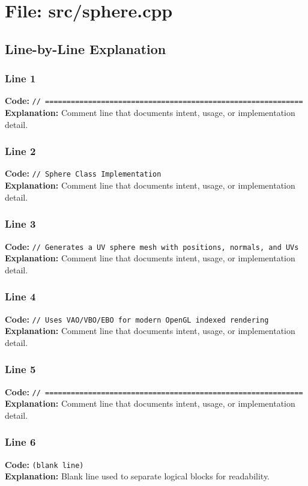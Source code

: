 \documentclass[11pt,a4paper]{article}
\begin{document}
\newpage
\section{File: src/sphere.cpp}
\subsection{Line-by-Line Explanation}
\subsubsection*{Line 1}
\textbf{Code:} \verb|// ============================================================|\\
\textbf{Explanation:} Comment line that documents intent, usage, or implementation detail.

\subsubsection*{Line 2}
\textbf{Code:} \verb|// Sphere Class Implementation|\\
\textbf{Explanation:} Comment line that documents intent, usage, or implementation detail.

\subsubsection*{Line 3}
\textbf{Code:} \verb|// Generates a UV sphere mesh with positions, normals, and UVs|\\
\textbf{Explanation:} Comment line that documents intent, usage, or implementation detail.

\subsubsection*{Line 4}
\textbf{Code:} \verb|// Uses VAO/VBO/EBO for modern OpenGL indexed rendering|\\
\textbf{Explanation:} Comment line that documents intent, usage, or implementation detail.

\subsubsection*{Line 5}
\textbf{Code:} \verb|// ============================================================|\\
\textbf{Explanation:} Comment line that documents intent, usage, or implementation detail.

\subsubsection*{Line 6}
\textbf{Code:} \texttt{(blank line)}\\
\textbf{Explanation:} Blank line used to separate logical blocks for readability.
\end{document}
